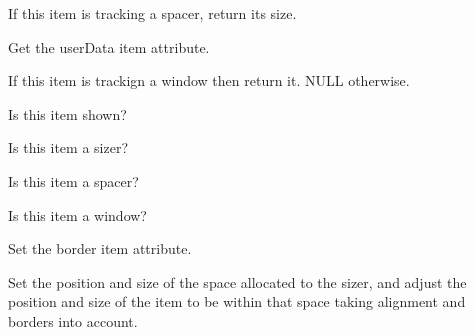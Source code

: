 
If this item is tracking a spacer, return its size.


\label{wxsizeritemgetuserdata}


Get the userData item attribute.


\label{wxsizeritemgetwindow}


If this item is trackign a window then return it.  NULL otherwise.

\label{wxsizeritemisshown}


Is this item shown?


\label{wxsizeritemissizer}


Is this item a sizer?


\label{wxsizeritemisspacer}


Is this item a spacer?


\label{wxsizeritemiswindow}


Is this item a window?


\label{wxsizeritemsetborder}


Set the border item attribute.

\label{wxsizeritemsetdimension}


Set the position and size of the space allocated to the sizer, and
adjust the position and size of the item to be within that space
taking alignment and borders into account.


\label{wxsizeritemsetflag}


